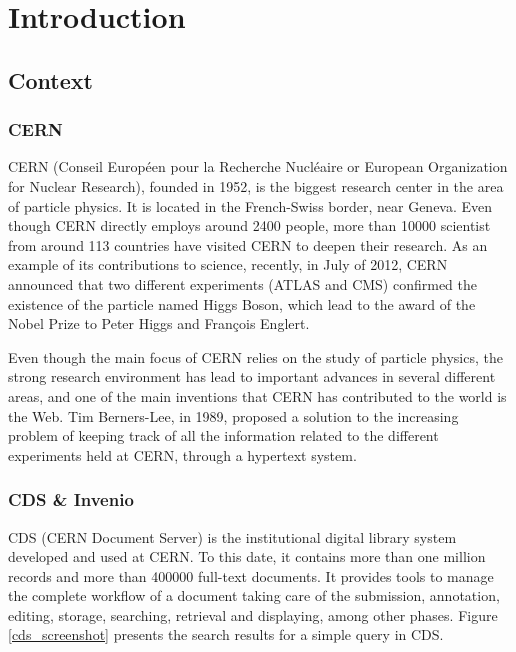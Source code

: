 \chapter{Introduction}


\section{Context}

\subsection{CERN}
CERN (Conseil Europ\'{e}en pour la Recherche Nucl\'{e}aire or European Organization for Nuclear Research)\cite{CERN}, founded in 1952, is the biggest research center in the area of particle physics. It is located in the French-Swiss border, near Geneva. Even though CERN directly employs around 2400 people, more than 10000 scientist from around 113 countries have visited CERN to deepen their research. As an example of its contributions to science, recently, in July of 2012, CERN announced that two different experiments (ATLAS and CMS) confirmed the existence of the particle named Higgs Boson, which lead to the award of the Nobel Prize to Peter Higgs and Fran\c{c}ois Englert.

Even though the main focus of CERN relies on the study of particle physics, the strong research environment has lead to important advances in several different areas, and one of the main inventions that CERN has contributed to the world is the Web. Tim Berners-Lee, in 1989, proposed a solution\cite{web_proposal} to the increasing problem of keeping track of all the information related to the different experiments held at CERN, through a hypertext system. 

\subsection{CDS \& Invenio}
CDS\cite{CDS1} (CERN Document Server) is the institutional digital library system developed and used at CERN\cite{CDS2}. To this date, it contains more than one million records and more than 400000 full-text documents. It provides tools to manage the complete workflow of a document taking care of the submission, annotation, editing, storage, searching, retrieval and displaying, among other phases. Figure \ref{cds_screenshot} presents the search results for a simple query in CDS.

